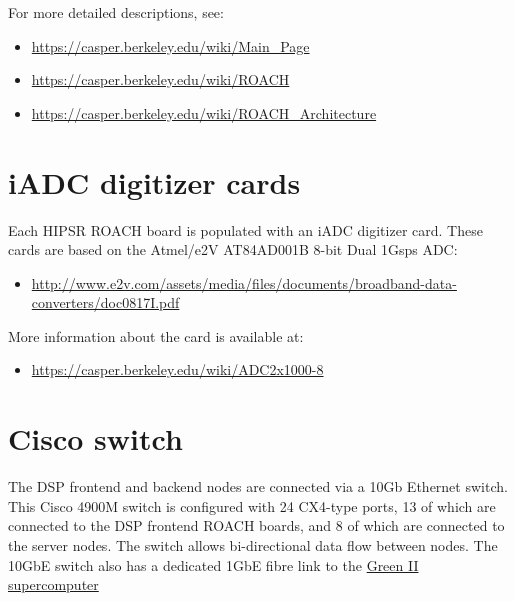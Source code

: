 \documentclass[letterpaper,10pt,english]{sphinxmanual}
\begin{document}
For more detailed descriptions, see:
\begin{itemize}
\item {} 
\href{https://casper.berkeley.edu/wiki/Main\_Page}{https://casper.berkeley.edu/wiki/Main\_Page}

\item {} 
\href{https://casper.berkeley.edu/wiki/ROACH}{https://casper.berkeley.edu/wiki/ROACH}

\item {} 
\href{https://casper.berkeley.edu/wiki/ROACH\_Architecture}{https://casper.berkeley.edu/wiki/ROACH\_Architecture}

\end{itemize}


\section{iADC digitizer cards}
\label{hardware:iadc-digitizer-cards}
Each HIPSR ROACH board is populated with an iADC digitizer card. These cards are
based on the Atmel/e2V AT84AD001B 8-bit Dual 1Gsps ADC:
\begin{itemize}
\item {} 
\href{http://www.e2v.com/assets/media/files/documents/broadband-data-converters/doc0817I.pdf}{http://www.e2v.com/assets/media/files/documents/broadband-data-converters/doc0817I.pdf}

\end{itemize}

More information about the card is available at:
\begin{itemize}
\item {} 
\href{https://casper.berkeley.edu/wiki/ADC2x1000-8}{https://casper.berkeley.edu/wiki/ADC2x1000-8}

\end{itemize}


\section{Cisco switch}
\label{hardware:cisco-switch}
The DSP frontend and backend nodes are connected via a 10Gb Ethernet switch. This Cisco 4900M switch is configured with 24 CX4-type ports, 13 of which are connected to the DSP frontend ROACH boards, and 8 of which are connected to the server nodes. The switch allows bi-directional data flow between nodes. The 10GbE switch also has a dedicated 1GbE fibre link to the \href{http://astronomy.swin.edu.au/supercomputing/green2/}{Green II supercomputer}
\end{document}

